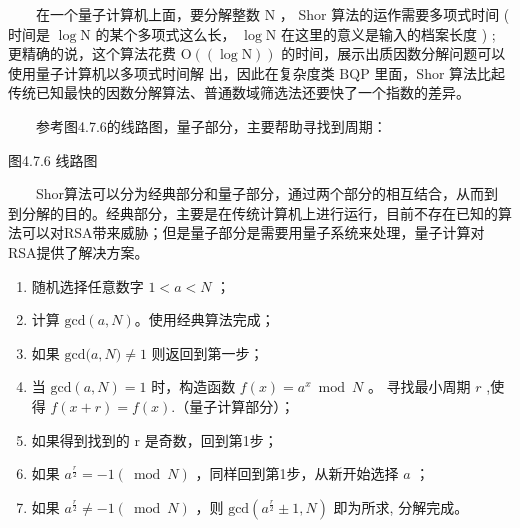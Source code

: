\documentclass[a4paper,11pt,english]{sphinxmanual}
\begin{document}
\sphinxAtStartPar
{}

\sphinxAtStartPar
  在一个量子计算机上面，要分解整数  \(\mathrm{N}\) ， Shor 算法的运作需要多项式时间 ( 时间是  \(\log \mathrm{N}\) 的某个多项式这么长，  \(\log \mathrm{N}\) 在这里的意义是输入的档案长度 ) ; 更精确的说，这个算法花费  \(\mathrm{O}((\log \mathrm{N}))\) 的时间，展示出质因数分解问题可以使用量子计算机以多项式时间解 出，因此在复杂度类  \(\mathrm{BQP}\) 里面，Shor 算法比起传统已知最快的因数分解算法、普通数域筛选法还要快了一个指数的差异。

\sphinxAtStartPar
  参考图4.7.6的线路图，量子部分，主要帮助寻找到周期：


\begin{center}图4.7.6 线路图
\end{center}
\sphinxAtStartPar
  Shor算法可以分为经典部分和量子部分，通过两个部分的相互结合，从而到到分解的目的。经典部分，主要是在传统计算机上进行运行，目前不存在已知的算法可以对RSA带来威胁；但是量子部分是需要用量子系统来处理，量子计算对RSA提供了解决方案。

\sphinxAtStartPar
{} 
\begin{enumerate}
%
\item {} 
\sphinxAtStartPar
随机选择任意数字 \(1<a<N\) ；

\item {} 
\sphinxAtStartPar
计算 \(\text{gcd}(a, N)\)。使用经典算法完成；

\item {} 
\sphinxAtStartPar
如果  \(\text{gcd}{(a}, N) \neq 1\) 则返回到第一步；

\item {} 
\sphinxAtStartPar
当 \(\text{gcd}(a, N)=1\) 时，构造函数 \(f(x)= a^{x} \bmod N\) 。 寻找最小周期  \(r\) ,使得 \(f(x+ r)=f(x)\).（量子计算部分）；

\item {} 
\sphinxAtStartPar
如果得到找到的 \(\mathrm{r}\) 是奇数，回到第1步；

\item {} 
\sphinxAtStartPar
如果 \(a^{\frac{r}{2}}=-1(\bmod N)\) ，同样回到第1步，从新开始选择 \(a\) ；

\item {} 
\sphinxAtStartPar
如果 \(a^{\frac{r}{2}} \neq-1(\bmod N)\) ，则  \(\text{gcd}(a^{\frac{r}{2}} \pm 1, N)\) 即为所求, 分解完成。

\end{enumerate}
\end{document}
